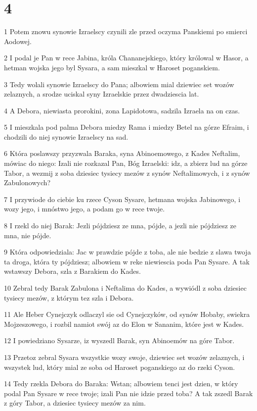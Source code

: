 \chapter{4}

\par 1 Potem znowu synowie Izraelscy czynili zle przed oczyma Panskiemi po smierci Aodowej.
\par 2 I podal je Pan w rece Jabina, króla Chananejskiego, który królowal w Hasor, a hetman wojska jego byl Sysara, a sam mieszkal w Haroset poganskiem.
\par 3 Tedy wolali synowie Izraelscy do Pana; albowiem mial dziewiec set wozów zelaznych, a srodze uciskal syny Izraelskie przez dwadziescia lat.
\par 4 A Debora, niewiasta prorokini, zona Lapidotowa, sadzila Izraela na on czas.
\par 5 I mieszkala pod palma Debora miedzy Rama i miedzy Betel na górze Efraim, i chodzili do niej synowie Izraelscy na sad.
\par 6 Która poslawszy przyzwala Baraka, syna Abinoemowego, z Kades Neftalim, mówiac do niego: Izali nie rozkazal Pan, Bóg Izraelski: idz, a zbierz lud na górze Tabor, a wezmij z soba dziesiec tysiecy mezów z synów Neftalimowych, i z synów Zabulonowych?
\par 7 I przywiode do ciebie ku rzece Cyson Sysare, hetmana wojska Jabinowego, i wozy jego, i mnóstwo jego, a podam go w rece twoje.
\par 8 I rzekl do niej Barak: Jezli pójdziesz ze mna, pójde, a jezli nie pójdziesz ze mna, nie pójde.
\par 9 Która odpowiedziala: Jac w prawdzie pójde z toba, ale nie bedzie z slawa twoja ta droga, która ty pójdziesz; albowiem w reke niewiescia poda Pan Sysare. A tak wstawszy Debora, szla z Barakiem do Kades.
\par 10 Zebral tedy Barak Zabulona i Neftalima do Kades, a wywiódl z soba dziesiec tysiecy mezów, z którym tez szla i Debora.
\par 11 Ale Heber Cynejczyk odlaczyl sie od Cynejczyków, od synów Hobaby, swiekra Mojzeszowego, i rozbil namiot swój az do Elon w Sananim, które jest w Kades.
\par 12 I powiedziano Sysarze, iz wyszedl Barak, syn Abinoemów na góre Tabor.
\par 13 Przetoz zebral Sysara wszystkie wozy swoje, dziewiec set wozów zelaznych, i wszystek lud, który mial ze soba od Haroset poganskiego az do rzeki Cyson.
\par 14 Tedy rzekla Debora do Baraka: Wstan; albowiem tenci jest dzien, w który podal Pan Sysare w rece twoje; izali Pan nie idzie przed toba? A tak zszedl Barak z góry Tabor, a dziesiec tysiecy mezów za nim.
